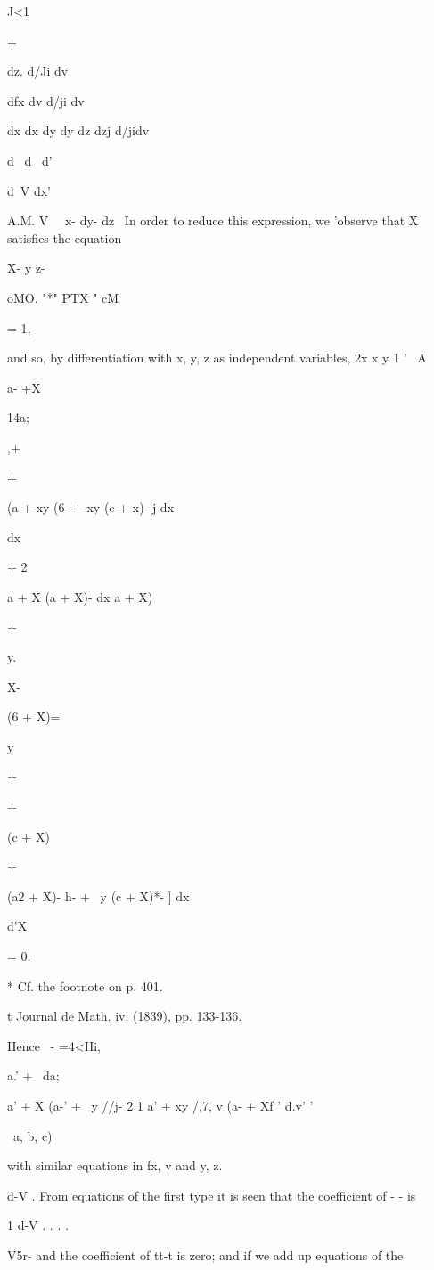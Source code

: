 {{{J<1

+

dz. d/Ji dv

dfx dv d/ji dv

dx dx dy dy dz dzj d/jidv

d \ d \ d'\

d\ V dx'

A.M. V \ \ x- dy- dz \ In order to reduce this expression, we 'observe
that X satisfies the equation

X- y z-

oMO. "*" PTX " cM

= 1,

and so, by differentiation with x, y, z as independent variables, 2x x
y  1 ' \ A

a- +X

14a;

,+

+

(a + xy (6- + xy (c + x)- j dx

dx

+ 2

a + X (a + X)- dx a + X)

+

y.

X-

(6 + X)=

y

+

+

(c + X)

+

(a2 + X)- h- + \ y (c + X)*- ] dx

d'X

= 0.

* Cf. the footnote on p. 401.

t Journal de Math. iv. (1839), pp. 133-136.

%
%

Hence ~- =4<Hi,

a.' + \ da;

a' + X (a-' + \ y //j- 2 1 a' + xy /,7, v (a- + Xf ' d.v' '

\ a, b, c)

with similar equations in fx, v and y, z.

d-V . From equations of the first type it is seen that the coefficient
of - - is

1 d-V . . . .

V5r- and the coefficient of tt-t is zero; and if we add up equations
of the

}}}
